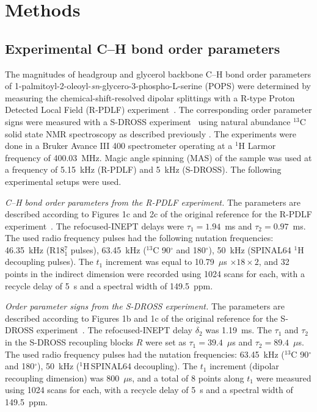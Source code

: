 \documentclass[journal=jpcbfk,manuscript=article]{achemso}
\begin{document}
\section{Methods}

\subsection{Experimental C--H bond order parameters}

The magnitudes of headgroup and glycerol backbone C--H bond order parameters of 1-palmitoyl-2-oleoyl-{\it sn}-glycero-3-phospho-L-serine (POPS)
were determined by measuring the chemical-shift-resolved dipolar splittings
with a R-type Proton Detected Local Field (R-PDLF) experiment~\cite{dvinskikh04}.
The corresponding order parameter signs were measured with a S-DROSS experiment~\cite{gross97}
using natural abundance $^{13}$C solid state NMR spectroscopy as described previously \cite{ferreira13,ferreira16}.
The experiments were done in a Bruker Avance III 400 spectrometer operating at a $^1$H Larmor frequency of 400.03~MHz.
Magic angle spinning (MAS) of the sample was used at a frequency of 5.15~kHz (R-PDLF) and 5~kHz (S-DROSS).
The following experimental setups were used.

{\emph{C--H bond order parameters from the R-PDLF experiment.}} The parameters are described according to Figures 1c and 2c of the original reference
for the R-PDLF experiment~\cite{dvinskikh04}.  The refocused-INEPT delays were $\tau_1=1.94$~ms and $\tau_2=0.97$~ms.
The used radio frequency pulses had the following nutation frequencies: 46.35~kHz (R18$^7_1$ pulses), 63.45~kHz ($^{13}$C 90$^{\circ}$ and 180$^{\circ}$),
50~kHz (SPINAL64 $^1$H decoupling pulses).
The $t_1$ increment was equal to 10.79~$\mu$s $\times18\times2$, and 32 points in the indirect
dimension were recorded using 1024 scans for each, with a recycle delay of 5~s and a spectral width of 149.5~ppm.

\emph{Order parameter signs from the S-DROSS experiment.}
The parameters are described according to Figures 1b and 1c of the original reference for the S-DROSS
experiment~\cite{gross97}. The refocused-INEPT delay $\delta_2$ was 1.19~ms. The $\tau_1$ and $\tau_2$ in the S-DROSS recoupling
blocks $R$ were set as $\tau_1=39.4$~$\mu$s and $\tau_2=89.4$~$\mu$s. The used radio frequency pulses had the nutation
frequencies: 63.45~kHz ($^{13}$C 90$^{\circ}$ and 180$^{\circ}$), 50~kHz ($^1$H\,SPINAL64 decoupling).
The $t_1$ increment (dipolar recoupling dimension) was 800~$\mu$s, and a total of 8 points along $t_1$ were
measured using 1024 scans for each, with a recycle delay of 5~s and a spectral width of 149.5~ppm.
\end{document}
